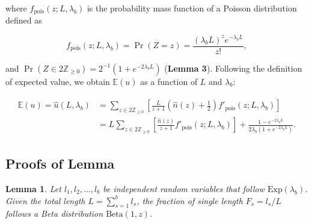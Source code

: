 \documentclass[11pt, class=article, crop=false]{standalone}
\newtheorem{lemma}{Lemma}
\begin{document}
where $f_{\text{pois}}(z; L, \lambda_b)$ is the probability mass function of a Poisson distribution defined as

\begin{equation}
    f_{\text{pois}}(z; L, \lambda_b) = \Pr(Z = z) = \frac{(\lambda_b L)^{z} e^{-\lambda_b L}}{z!},
\end{equation}

and $\Pr(Z \in 2\mathbb{Z}_{\ge 0}) = 2^{-1}(1 + e^{- 2 \lambda_b L})$ (\textbf{Lemma 3}). 
Following the definition of expected value, we obtain $\mathbb{E}(u)$ as a function of $L$ and $\lambda_b$:

\begin{align}
    \begin{split}
        \mathbb{E}(u) = \hat{u}(L, \lambda_b) 
                    &= \sum_{z \in 2\mathbb{Z}_{\ge 0}} \left[ \frac{L}{z + 1} \left(\hat{n}(z) + \frac{1}{2}\right) f'_{\text{pois}}(z; L, \lambda_b) \right]\\
                    &= L \sum_{z \in 2\mathbb{Z}_{\ge 0}} \left[ \frac{\hat{n}(z)}{z + 1} f'_{\text{pois}}(z; L, \lambda_b)\right] + 
                    \frac{1 - e^{-2 \lambda_b L}}{2 \lambda_b (1 + e^{-2 \lambda_b L})}.
    \end{split}
\end{align}

\newpage

\subsection{Proofs of Lemma}
\begin{lemma}
Let $l_1, l_2, \ldots, l_b$ be independent random variables that follow $\mbox{Exp}(\lambda_b)$. Given the total length $L=\sum_{s=1}^b l_s$, the fraction of single length $F_s=l_s/L$ follows a Beta distribution $\mbox{Beta}(1, z)$.
\end{lemma}
\end{document}
